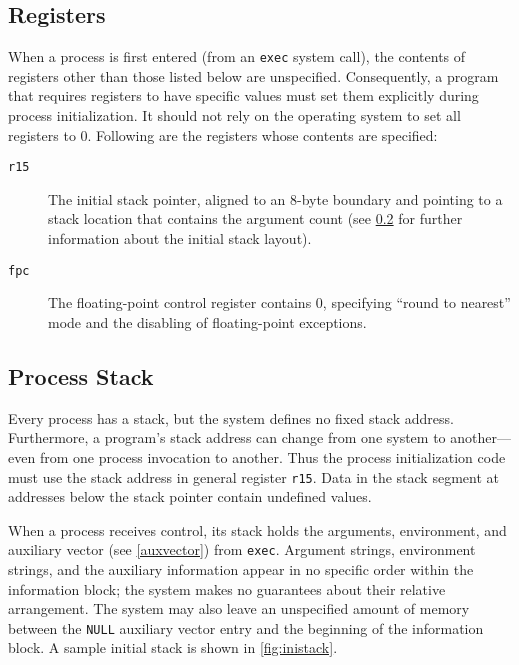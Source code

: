 \documentclass[english,11pt,twoside,toc=bib,toc=idx]{scrreprt}
\begin{document}
\subsection{Registers}
When a process is first entered (from an \texttt{exec} system call),
the contents of registers other than those listed below are
unspecified.  Consequently, a program that requires registers to have
specific values must set them explicitly during process
initialization.  It should not rely on the operating system to set all
registers to 0.  Following are the registers whose contents are
specified:
\begin{description}
\item[\texttt{r15}] The initial stack pointer, aligned to an 8-byte
  boundary and pointing to a stack location that contains the
  argument count (see \cref{processstack} for further
  information about the initial stack layout).
\item[\texttt{fpc}] The floating-point control register contains 0,
  specifying ``round to nearest'' mode and the disabling of
  floating-point exceptions.
\end{description}

\subsection{Process Stack}
\label{processstack}
Every process has a stack, but the system defines no fixed stack
address.  Furthermore, a program's stack address can change from one
system to another---even from one process invocation to another.
Thus the process initialization code must use the stack address in
general register \texttt{r15}.  Data in the stack segment at
addresses below the stack pointer contain undefined values.

When a process receives control, its stack holds the arguments,
environment, and auxiliary vector (see \cref{auxvector}) from
\texttt{exec}.  Argument strings, environment strings, and the auxiliary
information appear in no specific order within the information block; the
system makes no guarantees about their relative arrangement.  The system
may also leave an unspecified amount of memory between the \texttt{NULL}
auxiliary vector entry and the beginning of the information block.  A
sample initial stack is shown in \cref{fig:inistack}.
\end{document}
